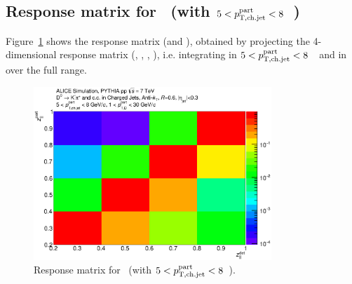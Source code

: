 \subsection{Response matrix for \zpar\ (with $5<p_{\mathrm{T,ch.jet}}^{\mathrm{part}}<8$~\GeVc)}
Figure~\ref{fig:D0_Full_R060_ResponseMatrix_Z_JetPt_5_8_DPt_01_30_Norm} shows the response matrix (\zpargen and \zpardet), obtained by
projecting the 4-dimensional response matrix (\zpargen, \ptchjetgen, \zpardet, \ptchjetdet), i.e. integrating in $5<p_{\mathrm{T,ch.jet}}^{\mathrm{part}}<8$~\GeVc\ and in  \ptchjetdet over the
full range.
\begin{figure}[tbh]
\begin{center}
\includegraphics[width=0.8\textwidth]{img/D0_Full_R060_ResponseMatrix_Z_JetPt_5_8_DPt_01_30_Norm}
 \caption{Response matrix for \zpar\ (with $5<p_{\mathrm{T,ch.jet}}^{\mathrm{part}}<8$~\GeVc).} 
 \label{fig:D0_Full_R060_ResponseMatrix_Z_JetPt_5_8_DPt_01_30_Norm}
\end{center}
\end{figure}
